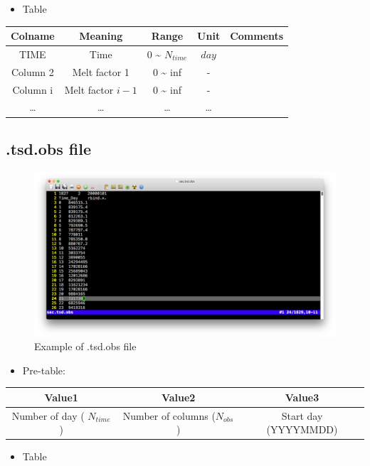 \documentclass[]{scrbook}
\providecommand{\tightlist}{%
  \setlength{\itemsep}{0pt}\setlength{\parskip}{0pt}}
\begin{document}
\begin{itemize}
\tightlist
\item
  Table
\end{itemize}

\begin{longtable}[]{@{}ccccc@{}}
\toprule
Colname & Meaning & Range & Unit & Comments\tabularnewline
\midrule
\endhead
TIME & Time & 0 \textasciitilde{} \(N_{time}\) & \(day\)
&\tabularnewline
Column 2 & Melt factor 1 & 0 \textasciitilde{} inf & - &\tabularnewline
Column i & Melt factor \(i-1\) & 0 \textasciitilde{} inf & -
&\tabularnewline
\ldots{} & \ldots{} & \ldots{} & \ldots{} &\tabularnewline
\bottomrule
\end{longtable}

\subsection{.tsd.obs file}\label{tsd.obs-file}

\begin{figure}
\centering
\includegraphics{Fig/IO/tsd.obs.png}
\caption{Example of .tsd.obs file}
\end{figure}

\begin{itemize}
\tightlist
\item
  Pre-table:
\end{itemize}

\begin{longtable}[]{@{}ccc@{}}
\toprule
Value1 & Value2 & Value3\tabularnewline
\midrule
\endhead
Number of day ( \(N_{time}\)) & Number of columns (\(N_{obs}\)) & Start
day (YYYYMMDD)\tabularnewline
\bottomrule
\end{longtable}

\begin{itemize}
\tightlist
\item
  Table
\end{itemize}
\end{document}
